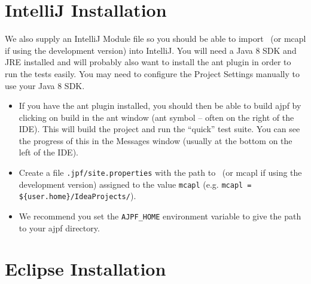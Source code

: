\section{IntelliJ Installation}
We also supply an IntelliJ Module file so you should be able to import \ajpfversion\ (or mcapl if using the development version) into IntelliJ.  You will need a Java 8 SDK and JRE installed and will probably also want to install the ant plugin in order to run the tests easily.  You may need to configure the Project Settings manually to use your Java 8 SDK.
\begin{itemize}
\item If you have the ant plugin installed, you should then be able to build ajpf by clicking on build in the ant window (ant symbol -- often on the right of the IDE).  This will build the project and run the ``quick'' test suite.  You can see the progress of this in the Messages window (usually at the bottom on the left of the IDE).
\item Create a file \texttt{.jpf/site.properties} with the path to \ajpfversion\ (or mcapl if using the development version)  assigned to the value \texttt{mcapl} (e.g. \texttt{mcapl = \$\{user.home\}/IdeaProjects/\ajpfversion}).
\item We recommend you set the \texttt{AJPF\_HOME} environment variable to give the path to your ajpf directory.  
\end{itemize}

\section{Eclipse Installation}

